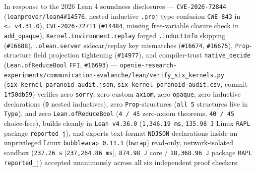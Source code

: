 \documentclass[10pt,letterpaper]{article}
\begin{document}
In response to the 2026 Lean 4 soundness disclosures ---
\texttt{CVE-2026-72844} (\texttt{leanprover/\allowbreak{}lean4\#14576}, nested
inductive \texttt{.proj} type confusion \texttt{CWE-843} in
\texttt{<=\ v4.31.0}), \texttt{CVE-2026-72711} (\texttt{\#14484},
missing free-variable closure check in \texttt{add\_opaque}),
\texttt{Kernel.\allowbreak{}Environment.\allowbreak{}replay} forged \texttt{.inductInfo} skipping
(\texttt{\#16688}), \texttt{.olean.server} sidecar/replay key mismatches
(\texttt{\#16674}, \texttt{\#16675}), \texttt{Prop}-structure field
projection tightening (\texttt{\#14977}), and compiler-trust
\texttt{native\_decide} (\texttt{Lean.\allowbreak{}ofReduceBool} \texttt{FFI},
\texttt{\#16693}) ---
\texttt{openie-\allowbreak{}research-\allowbreak{}experiments/\allowbreak{}communication-\allowbreak{}avalanche/\allowbreak{}lean/\allowbreak{}verify\_\allowbreak{}six\_\allowbreak{}kernels.\allowbreak{}py}
(\texttt{six\_\allowbreak{}kernel\_\allowbreak{}paranoid\_\allowbreak{}audit.\allowbreak{}json},
\texttt{six\_\allowbreak{}kernel\_\allowbreak{}paranoid\_\allowbreak{}audit.\allowbreak{}csv}, commit
\texttt{1f50db59}) verifies zero \texttt{sorry}, zero custom
\texttt{axiom}, zero \texttt{opaque}, zero inductive declarations
(\texttt{0} nested inductives), zero \texttt{Prop}-structures (\texttt{all\ 5}
structures live in \texttt{Type}), and zero
\texttt{Lean.\allowbreak{}ofReduceBool} (\texttt{4\ /\ 45} zero-axiom theorems,
\texttt{40\ /\ 45} choice-free), builds cleanly in
\texttt{Lean\ v4.36.0} (\texttt{1,346.19\ ms}, \texttt{135.98\ J} Linux
\texttt{RAPL} package \texttt{reported\_j}), and exports text-format
\texttt{NDJSON} declarations inside an unprivileged Linux
\texttt{bubblewrap\ 0.11.1} (\texttt{bwrap}) read-only, network-isolated
sandbox (\texttt{237.26\ s} [\texttt{237,264.86\ ms}],
\texttt{874.98\ J} core / \texttt{18,368.96\ J} package \texttt{RAPL}
\texttt{reported\_j}) accepted unanimously across all six independent
proof checkers:
\end{document}
